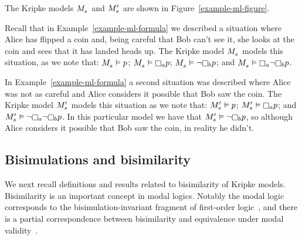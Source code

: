 \begin{example}
\begin{figure}
\end{figure}
The Kripke models $\kPModel{\kStateS}$ and $\kPModelP{\kStateS}$ are shown in Figure~\ref{example-ml-figure}.

Recall that in Example~\ref{example-ml-formula} we described a situation where Alice has flipped a coin and, being careful that Bob can't see it, she looks at the coin and sees that it has landed heads up.
The Kripke model $\kPModel{\kStateS}$ models this situation, as we note that:
$\kPModel{\kStateS} \entails \atomP$;
$\kPModel{\kStateS} \entails \knowsA \atomP$;
$\kPModel{\kStateS} \entails \lnot \knowsB \atomP$; and
$\kPModel{\kStateS} \entails \knowsA \lnot \knowsB \atomP$.

In Example~\ref{example-ml-formula} a second situation was described where Alice was not as careful and Alice considers it possible that Bob saw the coin.
The Kripke model $\kPModelP{\kStateS}$ models this situation as we note that:
$\kPModelP{\kStateS} \entails \atomP$;
$\kPModelP{\kStateS} \entails \knowsA \atomP$; and
$\kPModelP{\kStateS} \entails \lnot \knowsA \lnot \knowsB \atomP$.
In this particular model we have that $\kPModelP{\kStateS} \entails \lnot \knowsB \atomP$, so although Alice considers it possible that Bob saw the coin, in reality he didn't.
\end{example}

\subsection{Bisimulations and bisimilarity}

We next recall definitions and results related to bisimilarity of Kripke models.
Bisimilarity is an important concept in modal logics.
Notably the modal logic \logicK{} corresponds to the bisimulation-invariant fragment of first-order logic~\cite{vanbenthem:1984}, and there is a partial correspondence between bisimilarity and equivalence under modal validity~\cite{goranko:2006}.

